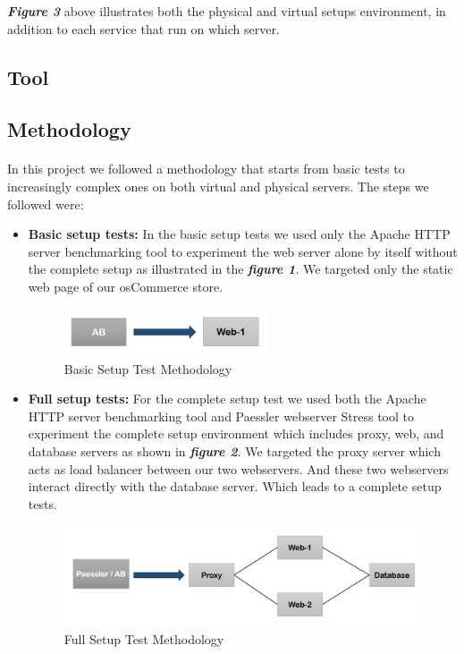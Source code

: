 \textbf{\textit{Figure 3}} above illustrates both the physical and virtual setups environment, in addition to each service that run on which server.


\subsection{Tool}



\clearpage
\subsection{Methodology}
\paragraph{}
In this project we followed a methodology that starts from basic tests to increasingly complex ones on both virtual and physical servers. The steps we followed were:
\begin{itemize}
    \item \textbf{Basic setup tests:}
 In the basic setup tests we used only the Apache HTTP server benchmarking tool to experiment the web server alone by itself without the complete setup as illustrated in the \textbf{\textit{figure 1}}. 
 We targeted only the static web page of our osCommerce store.
 \begin{figure}[H]
    \centering
    \includegraphics[width=6cm]{Pictures/simple.PNG}
    \caption{Basic Setup Test Methodology}
    \label{fig:QQ3}
\end{figure}
   
    
    
    \item \textbf{Full setup tests:}
 For the complete setup test we used both the Apache HTTP server benchmarking tool and Paessler webserver Stress tool to experiment the complete setup environment which includes proxy, web, and database servers as shown in \textbf{\textit{figure 2}}. 
 We targeted the proxy server which acts as load balancer between our two webservers. And these two webservers interact directly with the database server. Which leads to a complete setup tests.   
 \begin{figure}[H]
    \centering
    \includegraphics[width=12cm]{Pictures/complex.PNG}
    \caption{Full Setup Test Methodology}
    \label{fig:QQ3}
\end{figure}

\end{itemize}

